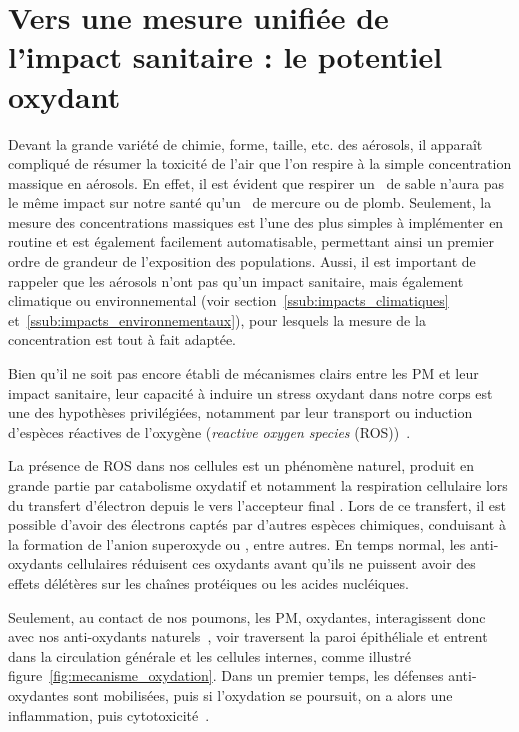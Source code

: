 \section{Vers une mesure unifiée de l'impact sanitaire : le potentiel oxydant}%
\label{sec:le_potentiel_oxydant_des_aerosols}

Devant la grande variété de chimie, forme, taille, etc. des aérosols, il apparaît
compliqué de résumer la toxicité de l'air que l'on respire à la simple concentration
massique en aérosols. En effet, il est évident que respirer un~\si{\ugm} de sable n'aura
pas le même impact sur notre santé qu'un~\si{\ugm} de mercure ou de plomb.  Seulement, la
mesure des concentrations massiques est l'une des plus simples à implémenter en routine et est également
facilement automatisable, permettant ainsi un premier ordre de grandeur de l'exposition
des populations. Aussi, il est important de rappeler que les aérosols n'ont pas qu'un
impact sanitaire, mais également climatique ou environnemental (voir
section~\ref{ssub:impacts_climatiques} et~\ref{ssub:impacts_environnementaux}),
pour lesquels la mesure de la concentration est tout à fait adaptée.

Bien qu'il ne soit pas encore établi de mécanismes clairs entre les PM et leur impact
sanitaire, leur capacité à induire un stress oxydant dans notre corps est une des
hypothèses privilégiées, notamment par leur transport ou induction d'espèces réactives de
l'oxygène (\textit{reactive oxygen species}
(ROS))~\autocite{squadritoQuinoid2001,liParticulate2003a,liUltrafine2003,gonzalez-flechaOxidant2004}.

La présence de ROS dans nos cellules est un phénomène naturel, produit en grande partie
par catabolisme oxydatif et notamment la respiration cellulaire lors du transfert
d'électron depuis le  vers l'accepteur final . Lors de ce transfert, il est
possible d'avoir des électrons captés par d'autres espèces chimiques, conduisant à la
formation de l'anion superoxyde  ou , entre autres.
En temps normal, les anti-oxydants cellulaires réduisent ces oxydants avant qu'ils ne
puissent avoir des effets délétères sur les chaînes protéiques ou les acides nucléiques.

Seulement, au contact de nos poumons, les PM, oxydantes, interagissent donc avec nos
anti-oxydants naturels~\autocite{kellyProtein2003}, voir traversent la paroi épithéliale
et entrent dans la circulation générale et les cellules internes, comme illustré
figure~\ref{fig:mecanisme_oxydation}.
Dans un premier temps, les défenses anti-oxydantes sont mobilisées, puis si l'oxydation se
poursuit, on a alors une inflammation, puis cytotoxicité~\autocite{baezaPollution2007}.

